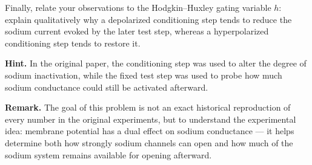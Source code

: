\documentclass{article}
\begin{document}
Finally, relate your observations to the Hodgkin--Huxley gating variable $h$:
explain qualitatively why a depolarized conditioning step tends to reduce the sodium current evoked by the later test step,
whereas a hyperpolarized conditioning step tends to restore it.

\textbf{Hint.}
In the original paper, the conditioning step was used to alter the degree of sodium inactivation,
while the fixed test step was used to probe how much sodium conductance could still be activated afterward. 

\textbf{Remark.}
The goal of this problem is not an exact historical reproduction of every number in the original experiments,
but to understand the experimental idea:
membrane potential has a dual effect on sodium conductance --- it helps determine both how strongly sodium channels can open and how much of the sodium system remains available for opening afterward. 
\end{document}
